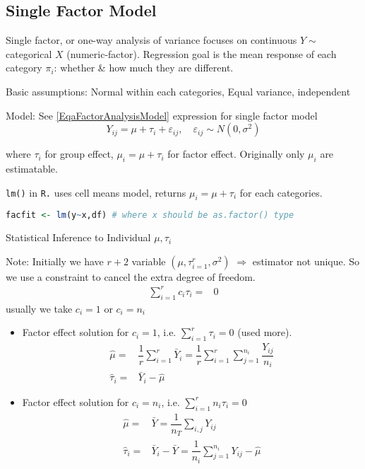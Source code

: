 \subsection{Single Factor Model}
    Single factor, or one-way analysis of variance focuses on continuous $ Y \sim $ categorical $ X $ (numeric-factor). Regression goal is the mean response of each category $ \pi_i $: whether \& how much they are different.

    Basic assumptions: Normal within each categories, Equal variance, independent

    Model: See \autoref{EqaFactorAnalysisModel} expression for single factor model
    \begin{equation}
        Y_{ij}=\mu+\tau_i+\varepsilon _{ij},\quad \varepsilon _{ij}\sim N(0,\sigma ^2)
    \end{equation}

    where $ \tau_i $ for group effect, $ \mu_i=\mu +\tau_i $ for factor effect. Originally only $ \mu_i $ are estimatable.

\begin{rcode}
    \lstinline|lm()| in \lstinline|R.| uses cell means model, returns $ \mu_i=\mu +\tau_i $ for each categories.
\begin{lstlisting}[language=R]
facfit <- lm(y~x,df) # where x should be as.factor() type
\end{lstlisting}
\end{rcode}    

\begin{point}
    Statistical Inference to Individual $ \mu ,\tau_i $
\end{point}

    Note: Initially we have $r+2$ variable $ (\mu ,\tau_{i=1}^r,\sigma ^2) $ $\Rightarrow $ estimator not unique. So we use a constraint to cancel the extra degree of freedom.
\begin{align*}
    \sum_{i=1}^rc_i\tau_i=&0
\end{align*}
    usually we take $ c_i=1 $ or $ c_i=n_i $

\begin{itemize}[topsep=2pt,itemsep=0pt]
    \item Factor effect solution for $ c_i=1 $, i.e. $ \sum_{i=1}^r \tau _i=0 $ (used more).
\begin{align*}
    \hat{\mu }=&\dfrac{1}{r}\sum_{i=1}^r\bar{Y}_i=\dfrac{1}{r}\sum_{i=1}^r\sum_{j=1}^{n_i}\dfrac{Y_{ij}}{n_i}\\
    \hat{\tau}_i=&\bar{Y}_i-\hat{\mu }
\end{align*}
    \item Factor effect solution for $ c_i=n_i $, i.e. $ \sum_{i=1}^r n_i\tau _i=0 $
\begin{align*}
    \hat{\mu }=&\bar{Y}=\dfrac{1}{n_T}\sum_{i,j}Y_{ij}\\
    \hat{\tau}_i=&\bar{Y}_i-\bar{Y}=\dfrac{1}{n_i}\sum_{j=1}^{n_i}Y_{ij}-\hat{\mu}\\
\end{align*}

\end{itemize}

